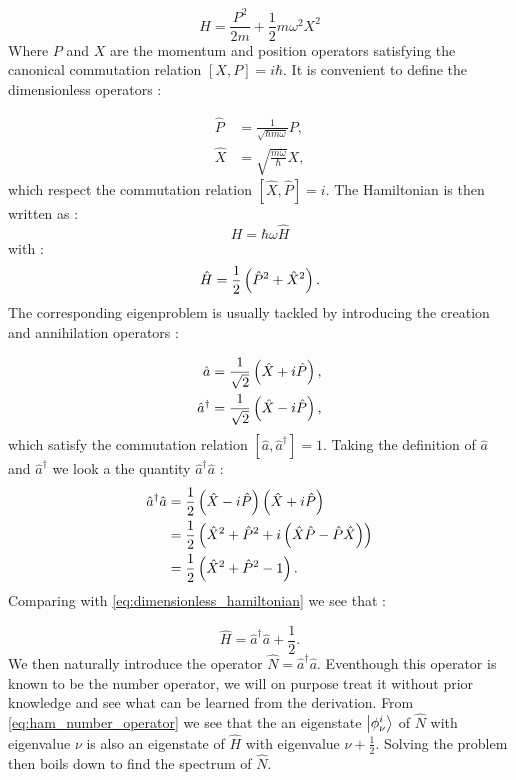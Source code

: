 \begin{equation}
    H=\frac{P^2}{2m}+\frac{1}{2}m\omega^2X^2
\end{equation}
Where $P$ and $X$ are the momentum and position operators satisfying the canonical commutation relation $[X,P]=i\hbar$.
It is convenient to define the dimensionless operators :

\begin{subequations}
    \begin{align}
        \hat{P}&=\frac{1}{\sqrt{\hbar m\omega}}P,\\
        \hat{X}&=\sqrt{\frac{m\omega}{\hbar}}X, 
    \end{align}
\end{subequations}
which respect the commutation relation $[\hat{X},\hat{P}]=i$. The Hamiltonian is then written as :
\begin{equation}
    H=\hbar\omega\hat{H}
\end{equation}
with :
\begin{equation}
    \label{eq:dimensionless_hamiltonian}
    \hat{H}=\frac{1}{2}\left(\hat{P}^2+\hat{X}^2\right).
\end{equation}
The corresponding eigenproblem is usually tackled by introducing the creation and annihilation operators :

\begin{subequations}
    \begin{align}
        \hat{a}&=\frac{1}{\sqrt{2}}\left(\hat{X}+i\hat{P}\right),\\
        \hat{a}^\dagger&=\frac{1}{\sqrt{2}}\left(\hat{X}-i\hat{P}\right),
    \end{align}
\end{subequations}
which satisfy the commutation relation $[\hat{a},\hat{a}^\dagger]=1$.
Taking the definition of $\hat{a}$ and $\hat{a}^\dagger$ we look a the quantity $\hat{a}^\dagger\hat{a}$ :
\begin{align}
\hat{a}^\dagger\hat{a}&=\frac{1}{2}\left(\hat{X}-i\hat{P}\right)\left(\hat{X}+i\hat{P}\right) \\
                      &=\frac{1}{2}\left(\hat{X}^2+\hat{P}^2+i\left(\hat{X}\hat{P}-\hat{P}\hat{X}\right)\right) \\
                      &=\frac{1}{2}\left(\hat{X}^2+\hat{P}^2-1\right).
\end{align}
Comparing with \autoref{eq:dimensionless_hamiltonian} we see that :

\begin{equation}
    \label{eq:ham_number_operator}
    \hat{H}=\hat{a}^\dagger\hat{a}+\frac{1}{2}.
\end{equation}
We then naturally introduce the operator $\hat{N}=\hat{a}^\dagger\hat{a}$. Eventhough this operator 
is known to be the number operator, we will on purpose treat it without prior knowledge and see what can be learned from the derivation.
From \autoref{eq:ham_number_operator} we see that the an eigenstate $\ket{\phi^i_\nu}$ of $\hat{N}$ with eigenvalue $\nu$ is also
an eigenstate of $\hat{H}$ with eigenvalue $\nu+\frac{1}{2}$. Solving the problem then boils down to find the spectrum of $\hat{N}$.


